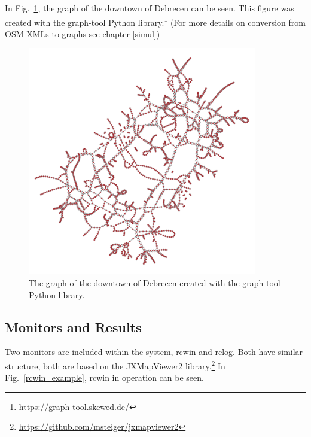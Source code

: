 \documentclass[b5paper,12pt]{report}
\theoremstyle{definition}
\begin{document}
In Fig.~\ref{dd_graph}, the graph of the downtown of Debrecen can be seen. This figure was created with the graph-tool Python library.\footnote{\url{https://graph-tool.skewed.de/}} (For more details on conversion from OSM XMLs to graphs see chapter \ref{simul})

\begin{figure}[ht!]
\centering
\includegraphics[width=10cm]{img/debrecen_downtown.pdf}
\caption{The graph of the downtown of Debrecen created with the graph-tool Python library.}
\label{dd_graph}
\end{figure}

\subsection{Monitors and Results}

Two monitors are included within the system, rcwin and rclog. Both have similar structure, both are based on the JXMapViewer2 library.\footnote{\url{https://github.com/msteiger/jxmapviewer2}} In Fig.~\ref{rcwin_example}, rcwin in operation can be seen.
\end{document}
